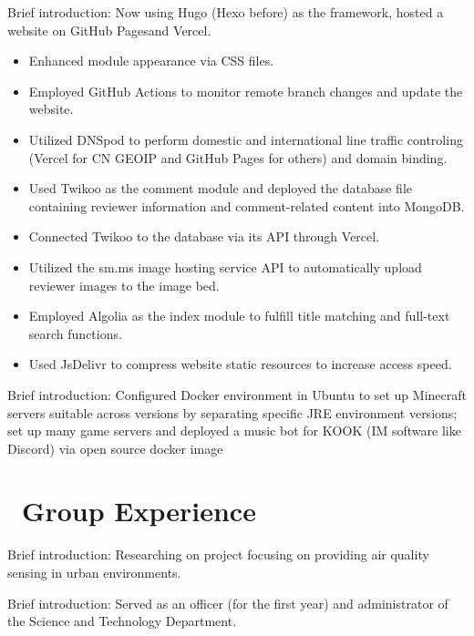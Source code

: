 \documentclass[12pt]{resume}
\begin{document}
Brief introduction: Now using Hugo (Hexo before) as the framework, hosted a website on GitHub Pagesand Vercel.
\begin{itemize}
  \item Enhanced module appearance via CSS files.
  \item Employed GitHub Actions to monitor remote branch changes and update the website.
  \item Utilized DNSpod to perform domestic and international line traffic controling (Vercel for CN GEOIP and GitHub Pages for others) and domain binding.
  \item Used Twikoo as the comment module and deployed the database file containing reviewer information and comment-related content into MongoDB.
  \item Connected Twikoo to the database via its API through Vercel.
  \item Utilized the sm.ms image hosting service API to automatically upload reviewer images to the image bed.
  \item Employed Algolia as the index module to fulfill title matching and full-text search functions.
  \item Used JsDelivr to compress website static resources to increase access speed.
\end{itemize}

Brief introduction: Configured Docker environment in Ubuntu to set up Minecraft servers suitable across versions by separating specific JRE environment versions; set up many game servers and deployed a music bot for KOOK (IM software like Discord) via open source docker image

\section{\texorpdfstring{\textbf{}\ Group Experience}{Group Experience}}
Brief introduction: Researching on project focusing on providing air quality sensing in urban environments.

Brief introduction: Served as an officer (for the first year) and administrator of the Science and Technology Department.
\end{document}
